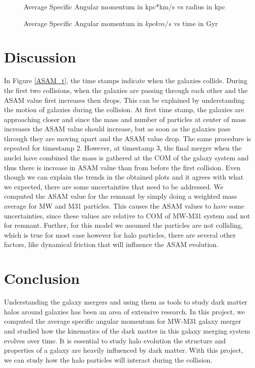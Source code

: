 \documentclass[twocolumn]{aastex631}
\begin{document}
\begin{figure}[H]\label{ASAM_r}
\caption {Average Specific Angular momentum in kpc*km/s vs radius in kpc}
\label{fig:ang_p}
\end{figure}

\begin{figure}[H]\label{ASAM_t}
\caption {Average Specific Angular momentum in $kpc km/s$ vs time in Gyr}
\label{fig:ang_p}
\end{figure}


\section{Discussion} \label{sec:disc}
In Figure \ref{ASAM_t}, the time stamps indicate when the galaxies collide. During the first two collisions, when the galaxies are passing through each other and the ASAM value first increases then drops. This can be explained by understanding the motion of galaxies during the collision. At first time stamp, the galaxies are approaching closer and since the mass and number of particles at center of mass increases the ASAM value should increase, but as soon as the galaxies pass through they are moving apart and the ASAM value drop. The same procedure is repeated for timestamp 2. However, at timestamp 3, the final merger when the nuclei have combined the mass is gathered at the COM of the galaxy system and thus there is increase in ASAM value than from before the first collision.
Even though we can explain the trends in the obtained plots and it agrees with what we expected, there are some uncertainties that need to be addressed. We computed the ASAM value for the remnant by simply doing a weighted mass average for MW and M31 particles. This causes the ASAM values to have some uncertainties, since these values are relative to COM of MW-M31 system and not for remnant. Further, for this model we assumed the particles are not colliding, which is true for most case however for halo particles, there are several other factors, like dynamical friction that will influence the ASAM evolution.

\section{Conclusion} \label{sec:conc}
Understanding the galaxy mergers and using them as tools to study dark matter halos around galaxies has been an area of extensive research. In this project, we computed the average specific angular momentum for MW-M31 galaxy merger and studied how the kinematics of the dark matter in this galaxy merging system evolves over time. It is essential to study halo evolution the structure and properties of a galaxy are heavily influenced by dark matter. With this project, we can study how the halo particles will interact during the collision.
\end{document}
